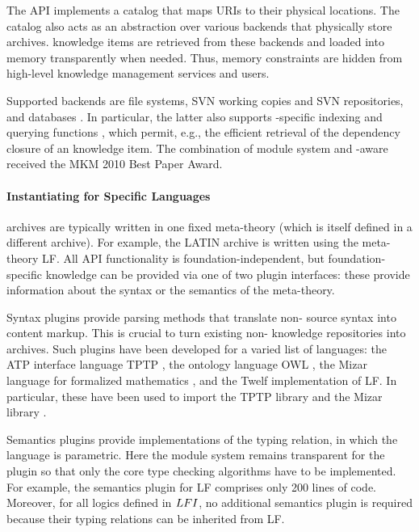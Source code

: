 The {\mmt} API implements a catalog that maps {\mmt} URIs to their physical locations.
The catalog also acts as an abstraction over various backends that physically store {\mmt} archives.
{\mmt} knowledge items are retrieved from these backends and loaded into memory transparently when needed.
Thus, memory constraints are hidden from high-level knowledge management services and users.

Supported backends are file systems, SVN working copies and SVN repositories, and  databases \cite{tntbase}.
In particular, the latter also supports {\mmt}-specific indexing and querying functions , which permit, e.g., the efficient retrieval of the dependency closure of an {\mmt} knowledge item.
The combination of {\mmt} module system and {\mmt}-aware  received the MKM 2010 Best Paper Award.

\paragraph{Instantiating {\mmt} for Specific Languages}
{\mmt} archives are typically written in one fixed meta-theory (which is itself defined in a different archive).
For example, the LATIN archive is written using the meta-theory LF.
All API functionality is foundation-independent, but foundation-specific knowledge can be provided via one of two plugin interfaces: these provide information about the syntax or the semantics of the meta-theory.

Syntax plugins provide parsing methods that translate non-{\mmt} source syntax into {\mmt} content markup.
This is crucial to turn existing non-{\mmt} knowledge repositories into {\mmt} archives.
Such plugins have been developed for a varied list of languages: the ATP interface language TPTP \cite{tptp}, the ontology language OWL \cite{owl}, the Mizar language for formalized mathematics \cite{mizar}, and the Twelf implementation \cite{twelf} of LF.
In particular, these have been used to import the TPTP library and the Mizar library \cite{IKRU:mizar:11}.

Semantics plugins provide implementations of the typing relation, in which the {\mmt} language is parametric.
Here the {\mmt} module system remains transparent for the plugin so that only the core type checking algorithms have to be implemented.
For example, the semantics plugin for LF comprises only 200 lines of code.
Moreover, for all logics defined in $LFI$, no additional semantics plugin is required because their typing relations can be inherited from LF.


